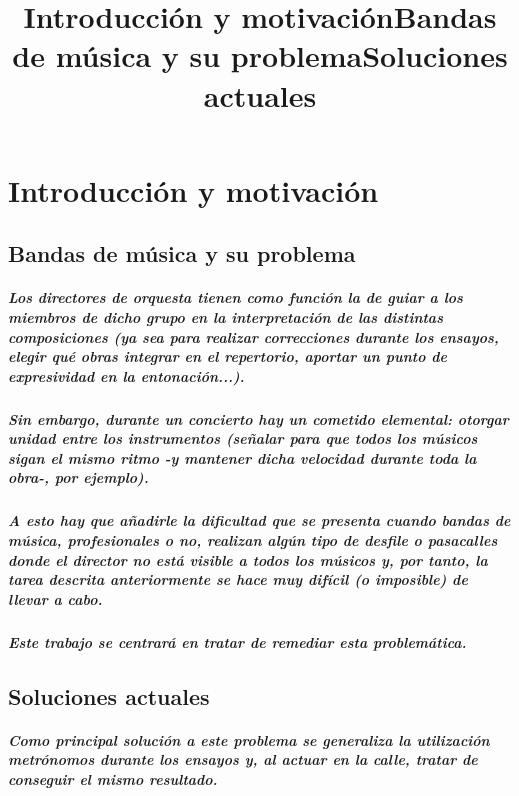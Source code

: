 \chapter{Introducción y motivación}
\title{Introducción y motivación}
\title{Bandas de música y su problema}
\section{Bandas de música y su problema}
\paragraph{
Los directores de orquesta tienen como función la de guiar a los miembros de dicho grupo en la interpretación de las distintas composiciones (ya sea para realizar correcciones durante los ensayos, elegir qué obras integrar en el repertorio, aportar un punto de expresividad en la entonación...).
}
\paragraph{
Sin embargo, durante un concierto hay un cometido elemental: otorgar unidad entre los instrumentos (señalar para que todos los músicos sigan el mismo ritmo -y mantener dicha velocidad durante toda la obra-, por ejemplo).
}
\paragraph{
A esto hay que añadirle la dificultad que se presenta cuando bandas de música, profesionales o no, realizan algún tipo de desfile o pasacalles donde el director no está visible a todos los músicos y, por tanto, la tarea descrita anteriormente se hace muy difícil (o imposible) de llevar a cabo.
}
\paragraph{
Este trabajo se centrará en tratar de remediar esta problemática.
}

\title{Soluciones actuales}
\section{Soluciones actuales}
\paragraph{
Como principal solución a este problema se generaliza la utilización metrónomos durante los ensayos y, al actuar en la calle, tratar de conseguir el mismo resultado.
}


